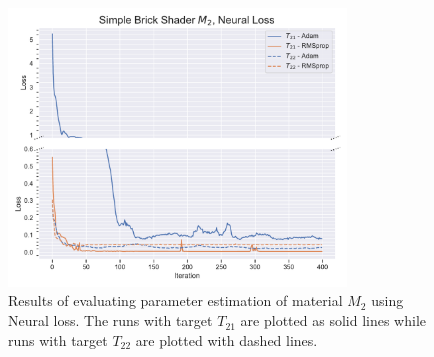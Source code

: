 \begin{figure}[h]
    \centering
    \includegraphics[width=0.8\textwidth]{img/evaluation/M2/SBS_Neural.pdf}
    \caption{Results of evaluating parameter estimation of material $M_2$ using Neural loss. The runs with target $T_{21}$ are plotted as solid lines while runs with target $T_{22}$ are plotted with dashed lines.}
    \label{fig:M2NeuralData}
\end{figure}

